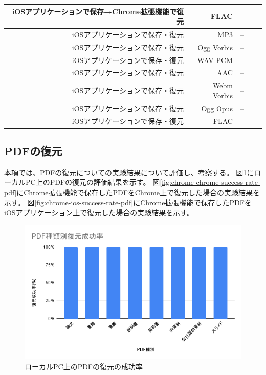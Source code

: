 \begin{table}[htbp]
\begin{center}
\begin{tabular}{rrrrr}
      iOSアプリケーションで保存→Chrome拡張機能で復元 & FLAC & --  \\ \hline
      iOSアプリケーションで保存・復元 & MP3 & --  \\ \hline
      iOSアプリケーションで保存・復元 & Ogg Vorbis & --  \\ \hline
      iOSアプリケーションで保存・復元 & WAV PCM & --  \\ \hline
      iOSアプリケーションで保存・復元 & AAC & --  \\ \hline
      iOSアプリケーションで保存・復元 & Webm Vorbis & --  \\ \hline
      iOSアプリケーションで保存・復元 & Ogg Opus & --  \\ \hline
      iOSアプリケーションで保存・復元 & FLAC & --  \\ \hline
    \end{tabular}
  \end{center}
\end{table}

\subsection{PDFの復元}
本項では、PDFの復元についての実験結果について評価し、考察する。
図\ref{fig:local-success-rate-pdf}にローカルPC上のPDFの復元の評価結果を示す。
図\ref{fig:chrome-chrome-success-rate-pdf}にChrome拡張機能で保存したPDFをChrome上で復元した場合の実験結果を示す。
図\ref{fig:chrome-ios-success-rate-pdf}にChrome拡張機能で保存したPDFをiOSアプリケーション上で復元した場合の実験結果を示す。

\begin{figure}[htbp]
  \caption{ローカルPC上のPDFの復元の成功率}
  \label{fig:local-success-rate-pdf}
  \begin{center}
    \includegraphics[bb=0 0 600 371,width=15cm]{img/060_evaluation/success-rate-pdf.pdf}
  \end{center}
\end{figure}

